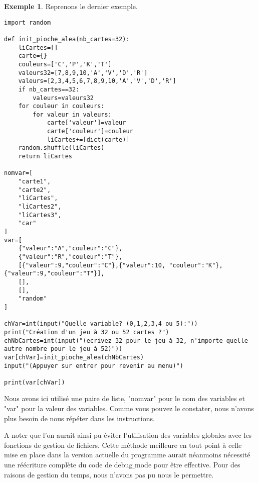 \documentclass[10pt,a4paper,french,titlepage]{article}
\theoremstyle{definition}
\newtheorem{exmp}{Exemple}
\begin{document}
\begin{exmp}
Reprenons le dernier exemple.
\begin{lstlisting}
import random

def init_pioche_alea(nb_cartes=32):
    liCartes=[]
    carte={}
    couleurs=['C','P','K','T']
    valeurs32=[7,8,9,10,'A','V','D','R']
    valeurs=[2,3,4,5,6,7,8,9,10,'A','V','D','R']
    if nb_cartes==32:
        valeurs=valeurs32
    for couleur in couleurs:
        for valeur in valeurs:
            carte['valeur']=valeur
            carte['couleur']=couleur
            liCartes+=[dict(carte)]   
    random.shuffle(liCartes)
    return liCartes

nomvar=[
    "carte1",
    "carte2",
    "liCartes",
    "liCartes2",
    "liCartes3",
    "car"
]
var=[
    {"valeur":"A","couleur":"C"},
    {"valeur":"R","couleur":"T"},
    [{"valeur":9,"couleur":"C"},{"valeur":10, "couleur":"K"},{"valeur":9,"couleur":"T"}],
    [],
    [],
    "random"
]

chVar=int(input("Quelle variable? (0,1,2,3,4 ou 5):"))
print("Création d'un jeu à 32 ou 52 cartes ?")
chNbCartes=int(input("(ecrivez 32 pour le jeu à 32, n'importe quelle autre nombre pour le jeu à 52)"))
var[chVar]=init_pioche_alea(chNbCartes)
input("(Appuyer sur entrer pour revenir au menu)")

print(var[chVar])
\end{lstlisting}
Nous avons ici utilisé une paire de liste, "nomvar" pour le nom des variables et "var" pour la valeur des variables. Comme vous pouvez le constater, nous n'avons plus besoin de nous répéter dans les instructions.
\end{exmp}
A noter que l'on aurait ainsi pu éviter l'utilisation des variables globales avec les fonctions de gestion de fichiers. Cette méthode meilleure en tout point à celle mise en place dans la version actuelle du programme aurait néanmoins nécessité une réécriture complète du code de debug$\_$mode pour être effective. Pour des raisons de gestion du temps, nous n'avons pas pu nous le permettre.
\end{document}
